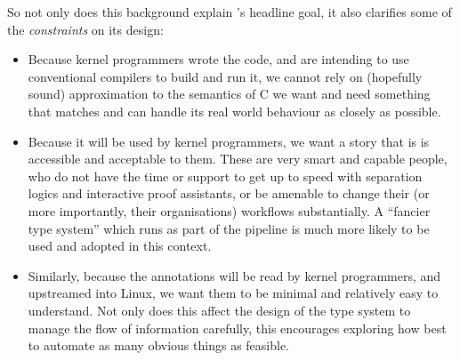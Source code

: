 So not only does this background explain 's headline goal, it also
clarifies some of the \emph{constraints} on its design:
\begin{itemize}
    \item Because kernel programmers wrote the code, and are intending to use
        conventional compilers to build and run it, we
        cannot rely on (hopefully sound) approximation to the semantics of C
        \textemdash{} we want and need something that matches and can handle
        its real world behaviour as closely as possible.
    \item Because it will be used by kernel programmers, we want a story that is
        is accessible and acceptable to them. These are very smart and
        capable people, who do not have the time or support to get up to
        speed with separation logics and interactive proof assistants, or be
        amenable to change their (or more importantly, their organisations)
        workflows substantially. A ``fancier type system'' which runs as part of
        the  pipeline is much more
        likely to be used and adopted in this context.
    \item Similarly, because the annotations will be read by kernel programmers,
        and upstreamed into Linux, we want them to be minimal and relatively
        easy to understand. Not only does this affect the design of the type
        system to manage the flow of information carefully, this encourages
        exploring how best to automate as many obvious things as feasible.
\end{itemize}

